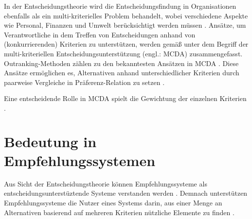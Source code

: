 In der Entscheidungstheorie wird die Entscheidungsfindung in Organisationen ebenfalls als ein multi-kriterielles Problem behandelt, wobei verschiedene Aspekte wie Personal, Finanzen und Umwelt berücksichtigt werden müssen \cite[S. 50]{adomavicius:inproceedings:2}.
Ansätze, um Verantwortliche in dem Treffen von Entscheidungen anhand von (konkurrierenden) Kriterien zu unterstützen, werden gemäß \textcite[S. 50]{adomavicius:inproceedings:2} unter dem Begriff der multi-kriteriellen Entscheidungsunterstützung (engl.: \ac{MCDA}) zusammengefasst.
Outranking-Methoden zählen zu den bekanntesten Ansätzen in \ac{MCDA} \cite[S. 50]{adomavicius:inproceedings:2}.
Diese Ansätze ermöglichen es, Alternativen anhand unterschiedlicher Kriterien durch paarweise Vergleiche in Präferenz-Relation zu setzen \cite[S. 249]{bouyssou:inbook}.

Eine entscheidende Rolle in \ac{MCDA} spielt die Gewichtung der einzelnen Kriterien \cite[S. 206]{hdioud:inproceedings}\cite[S. 195]{nemeth:article}.


\section{Bedeutung in Empfehlungssystemen}
\label{ch:erweiterungen:bedeutung}
Aus Sicht der Entscheidungstheorie \cite[S. 77]{jannach:inproceedings} können Empfehlungssysteme als entscheidungsunterstüztende Systeme verstanden werden \cite[S. 398f.]{huang:article}.
Demnach unterstützen Empfehlungssysteme die Nutzer eines Systems darin, aus einer Menge an Alternativen basierend auf mehreren Kriterien nützliche Elemente zu finden \cite[S. 398f.]{huang:article}.

